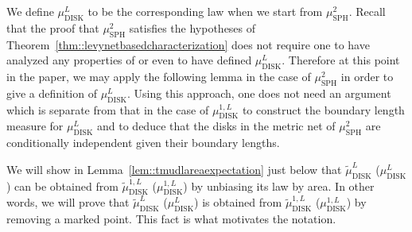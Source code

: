 \documentclass[JEP,XML,SOM,Unicode]{cedram}
\theoremstyle{plain}
\numberwithin{theorem}{section}
\theoremstyle{definition}
\newcommand{\mustwo}{\mu_{\mathrm{SPH}}^2}
\newcommand{\mudonel}{\mu_{ \mathrm{DISK}}^{1, L}}
\newcommand{\mudl}{\mu_{\mathrm{DISK}}^L}
\newcommand{\tmudonel}{\wt{\mu}_{ \mathrm{DISK}}^{1, L}}
\newcommand{\tmudl}{\wt{\mu}_{\mathrm{DISK}}^L}
\let\wt\widetilde
\begin{document}
We define $\mudl$ to be the corresponding law when we start from $\mustwo$. Recall that the proof that $\mustwo$ satisfies the hypotheses of Theorem~\ref{thm::levynetbasedcharacterization} does not require one to have analyzed any properties of or even to have defined $\mudl$. Therefore at this point in the paper, we may apply the following lemma in the case of $\mustwo$ in order to give a definition of $\mudl$. Using this approach, one does not need an argument which is separate from that in the case of $\mudonel$ to construct the boundary length measure for $\mudl$ and to deduce that the disks in the metric net of $\mustwo$ are conditionally independent given their boundary lengths.

We will show in Lemma~\ref{lem::tmudlareaexpectation} just below that $\tmudl$ (\resp $\mudl$) can be obtained from $\tmudonel$ (\resp $\mudonel$) by unbiasing its law by area. In other words, we will prove that $\tmudl$ (\resp $\mudl$) is obtained from $\tmudonel$ (\resp $\mudonel$) by removing a marked point. This fact is what motivates the notation.
\end{document}
